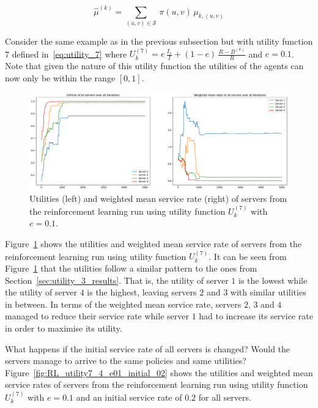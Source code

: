\begin{equation}
    \hat{\mu}^{(k)} = \sum_{(u, v) \in \mathcal{S}} \,
    \pi(u, v) \, \mu_{k, (u, v)}
\end{equation}

Consider the same example as in the previous subsection but with utility
function 7 defined in~\eqref{eq:utility_7} where
\(U_k^{(7)} = e \, \frac{I_s}{I} + (1 - e) \, \frac{R - B^{(k)}}{R}\) and
\(e = 0.1\).
Note that given the nature of this utility function the utilities of the agents
can now only be within the range \([0, 1]\).

\begin{figure}[H]
    \includegraphics[width=\textwidth]{chapters/06_agent_based_extension/Bin/reinforcement_learning_results/utility_7/u7_4_e01.pdf}
    \caption{Utilities (left) and weighted mean service rate (right) of servers
    from the reinforcement learning run using utility function \(U_k^{(7)}\)
    with \(e = 0.1\).}
    \label{fig:RL_utility7_4_e01}
\end{figure}

Figure~\ref{fig:RL_utility7_4_e01} shows the utilities and weighted mean
service rate of servers from the reinforcement learning run using utility
function \(U_k^{(7)}\).
It can be seen from Figure~\ref{fig:RL_utility7_4_e01} that the utilities
follow a similar pattern to the ones from Section~\ref{sec:utility_3_results}.
That is, the utility of server \(1\) is the lowest while the utility of server
\(4\) is the highest, leaving servers \(2\) and \(3\) with similar utilities
in between.
In terms of the weighted mean service rate, servers \(2\), \(3\) and \(4\)
managed to reduce their service rate while server \(1\) had to increase its
service rate in order to maximise its utility.

What happens if the initial service rate of all servers is changed?
Would the servers manage to arrive to the same policies and same utilities?
Figure~\ref{fig:RL_utility7_4_e01_initial_02} shows the utilities and weighted
mean service rates of servers from the reinforcement learning run using utility
function \(U_k^{(7)}\) with \(e = 0.1\) and an initial service rate of
\(0.2\) for all servers.

